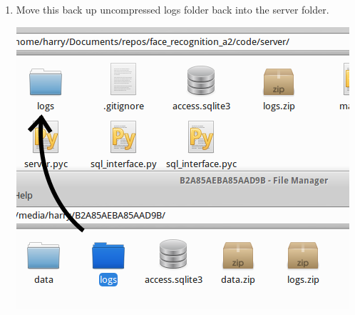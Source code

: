 \documentclass[a4paper]{article}
\begin{document}
\begin{enumerate}
                \item Move this back up uncompressed logs folder back into the server folder.
                \begin{center}
                \includegraphics[scale=0.6]{../shared_assets/screenshots/manual/serverlogmove.png}
                \end{center}
            \end{enumerate}
\end{document}
